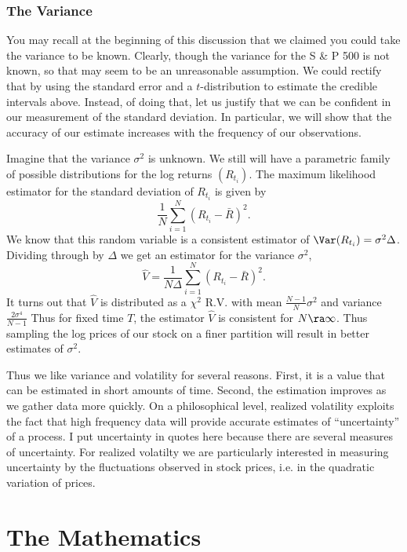 \documentclass{report}
\begin{document}
\subsection{The Variance}

You may recall at the beginning of this discussion that we claimed you
could take the variance to be known.  Clearly, though the variance for
the S \& P 500 is not known, so that may seem to be an unreasonable
assumption.  We could rectify that by using the standard error and a
$t$-distribution to estimate the credible intervals above.  Instead,
of doing that, let us justify that we can be confident in our
measurement of the standard deviation.  In particular, we will show
that the accuracy of our estimate increases with the frequency of our
observations.  

Imagine that the variance $\sigma^2$ is unknown.  We still will have a
parametric family of possible distributions for the log returns
$(R_{t_i})$.  The maximum likelihood estimator for the standard
deviation of $R_{t_i}$ is given by
\[
\frac{1}{N} \sum_{i=1}^N (R_{t_i} - \bar R)^2.
\]
We know that this random variable is a consistent estimator of
$\Var(R_{t_i}) = \sigma^2 \Delta$.  Dividing through by $\Delta$ we
get an estimator for the variance $\sigma^2$,
\[
\hat V = \frac{1}{N \Delta} \sum_{i=1}^N(R_{t_i} - \bar R)^2.
\]
It turns out that $\hat V$ is distributed as a $\chi^2$ R.V. with mean
$\frac{N-1}{N} \sigma^2$ and variance $\frac{2 \sigma^4}{N-1}$  Thus
for fixed time $T$, the estimator $\hat V$ is consistent for $N \ra
\infty$.  Thus sampling the log prices of our stock on a finer
partition will result in better estimates of $\sigma^2$.

Thus we like variance and volatility for several reasons.  First, it
is a value that can be estimated in short amounts of time.  Second,
the estimation improves as we gather data more quickly.  On a
philosophical level, realized volatility exploits the fact that high
frequency data will provide accurate estimates of ``uncertainty'' of a
process.  I put uncertainty in quotes here because there are several
measures of uncertainty.  For realized volatilty we are particularly
interested in measuring uncertainty by the fluctuations observed in
stock prices, i.e. in the quadratic variation of prices.

\chapter{The Mathematics}
\end{document}
